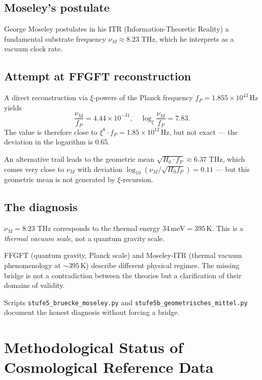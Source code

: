\subsection{Moseley's postulate}

George Moseley postulates in his ITR (Information-Theoretic Reality) a fundamental substrate frequency \(\nu_M \approx 8.23\) THz, which he interprets as a vacuum clock rate.

\subsection{Attempt at FFGFT reconstruction}

A direct reconstruction via \(\xi\)-powers of the Planck frequency \(f_P = 1.855 \times 10^{43}\,\text{Hz}\) yields
\begin{equation}
\frac{\nu_M}{f_P} = 4.44 \times 10^{-31}, \quad \log_\xi \frac{\nu_M}{f_P} = 7.83.
\end{equation}
The value is therefore close to \(\xi^8 \cdot f_P = 1.85 \times 10^{12}\,\text{Hz}\), but not exact --- the deviation in the logarithm is \(0.65\).

An alternative trail leads to the geometric mean \(\sqrt{H_0 \cdot f_P} \approx 6.37\) THz, which comes very close to \(\nu_M\) with deviation \(\log_{10}(\nu_M/\sqrt{H_0 f_P}) = 0.11\) --- but this geometric mean is not generated by \(\xi\)-recursion.

\subsection{The diagnosis}

\(\nu_M = 8.23\) THz corresponds to the thermal energy \(34\,\text{meV} = 395\,\text{K}\). This is a \emph{thermal vacuum scale}, not a quantum gravity scale.

\begin{conclusionBox}
FFGFT (quantum gravity, Planck scale) and Moseley-ITR (thermal vacuum phenomenology at \(\sim 395\,\text{K}\)) describe different physical regimes. The missing bridge is not a contradiction between the theories but a clarification of their domains of validity.
\end{conclusionBox}

Scripts \texttt{stufe5\_bruecke\_moseley.py} and \texttt{stufe5b\_geometrisches\_mittel.py} document the honest diagnosis without forcing a bridge.

\section{Methodological Status of Cosmological Reference Data}
\label{sec:cosmology_methodology}


